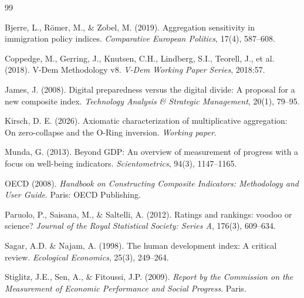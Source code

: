 \documentclass[12pt]{article}
\begin{document}

\begin{thebibliography}{99}

Bjerre, L., R\"omer, M., \& Zobel, M. (2019).
\newblock Aggregation sensitivity in immigration policy indices.
\newblock \emph{Comparative European Politics}, 17(4), 587--608.

Coppedge, M., Gerring, J., Knutsen, C.H., Lindberg, S.I., Teorell, J., et al. (2018).
\newblock V-Dem Methodology v8.
\newblock \emph{V-Dem Working Paper Series}, 2018:57.

James, J. (2008).
\newblock Digital preparedness versus the digital divide: A proposal for a new composite index.
\newblock \emph{Technology Analysis \& Strategic Management}, 20(1), 79--95.

Kirsch, D. E. (2026).
\newblock Axiomatic characterization of multiplicative aggregation: On zero-collapse and the O-Ring inversion.
\newblock \emph{Working paper}.

Munda, G. (2013).
\newblock Beyond GDP: An overview of measurement of progress with a focus on well-being indicators.
\newblock \emph{Scientometrics}, 94(3), 1147--1165.

OECD (2008).
\newblock \emph{Handbook on Constructing Composite Indicators: Methodology and User Guide}.
\newblock Paris: OECD Publishing.

Paruolo, P., Saisana, M., \& Saltelli, A. (2012).
\newblock Ratings and rankings: voodoo or science?
\newblock \emph{Journal of the Royal Statistical Society: Series A}, 176(3), 609--634.

Sagar, A.D. \& Najam, A. (1998).
\newblock The human development index: A critical review.
\newblock \emph{Ecological Economics}, 25(3), 249--264.

Stiglitz, J.E., Sen, A., \& Fitoussi, J.P. (2009).
\newblock \emph{Report by the Commission on the Measurement of Economic Performance and Social Progress}.
\newblock Paris.

\end{thebibliography}
\end{document}
